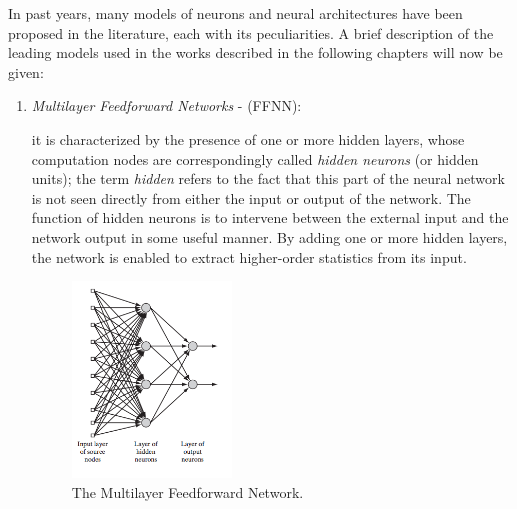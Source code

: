 In past years, many models of neurons and neural architectures have been proposed in the literature, each with its peculiarities. A brief description of the leading models used in the works described in the following chapters will now be given:
\begin{enumerate}
	
	
	
	\item \textit{Multilayer Feedforward Networks} - (FFNN):
	
	it is characterized by the presence of one or more hidden layers, whose computation nodes are correspondingly called \textit{hidden neurons} (or hidden units);
	the term \textit{hidden} refers to the fact that this part of the neural network is not seen directly from either the input or output of the network. 
	The function of hidden neurons is to intervene between the external input and the network output in some useful manner. By adding one or more hidden layers, the network is enabled to extract higher-order statistics from its input. 
	
	
	\begin{figure}
		\centering
		\includegraphics[width=0.4\textwidth]{img/MLP}
		\caption{The Multilayer Feedforward Network.}
	\end{figure}
	

\end{enumerate}
